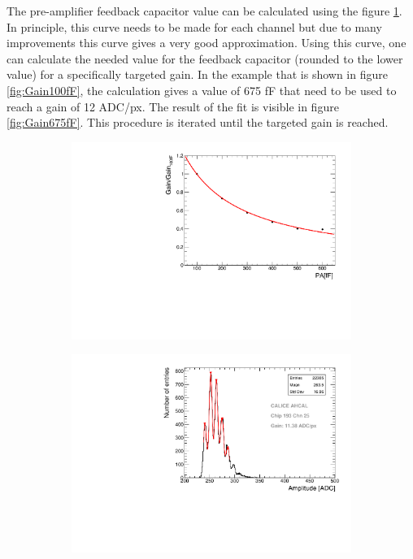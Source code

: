 The pre-amplifier feedback capacitor value can be calculated using the figure \ref{fig:PA_curve}. In principle, this curve needs to be made for each channel but due to many improvements this curve gives a very good approximation. Using this curve, one can calculate the needed value for the feedback capacitor (rounded to the lower value) for a specifically targeted gain. In the example that is shown in figure \ref{fig:Gain100fF}, the calculation gives a value of 675 fF that need to be used to reach a gain of 12 ADC/px. The result of the fit is visible in figure \ref{fig:Gain675fF}. This procedure is iterated until the targeted gain is reached. %

\begin{figure}[htbp!]
  \centering
  \begin{subfigure}[t]{0.49\textwidth}
    \includegraphics[width=1.\linewidth]{../Thesis_Plots/Commissioning/Plots/GainvsPA.pdf}
    \caption{} \label{fig:PA_curve}
  \end{subfigure}
  \hfill
  \begin{subfigure}[t]{0.49\textwidth}
    \includegraphics[width=1.\linewidth]{../Thesis_Plots/Commissioning/Plots/Gain675fF_MainzHBU4.pdf}

\end{subfigure}
\end{figure}
